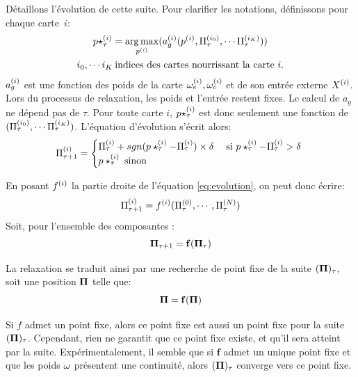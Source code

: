 Détaillons l'évolution de cette suite. Pour clarifier les notations, définissons pour chaque carte~$i$:
\begin{equation}
\begin{gathered}
p\star^{({i})}_{\tau} = \operatorname*{arg\,max}_{p^{({i})}}(a_g^{({i})}(p^{({i})},\Pi^{({i_0})}_\tau, \cdots \Pi^{({i_K})}_\tau))\\
 i_0, \cdots i_K \: \text{indices des cartes nourrissant la carte $i$}.
\end{gathered}
\label{eq:pstar}
\end{equation}
$a_g^{({i})}$ est une fonction des poids de la carte $\omega_{e}^{({i})}, \omega_{c}^{({i})}$ et de son entrée externe $X^{({i})}$. Lors du processus de relaxation, les poids et l'entrée restent fixes. Le calcul de $a_g$ ne dépend pas de $\tau$.
Pour toute carte $i$, $p\star^{({i})}_{\tau}$ est donc seulement une fonction de $(\Pi^{({i_0})}_\tau, \cdots \Pi^{({i_K})}_\tau)$.
L'équation d'évolution s'écrit alors: 
\begin{equation}
\Pi^{({i})}_{\tau+1} = 
\begin{cases}
\Pi^{({i})}_{\tau} + sgn(p\star^{({i})}_{\tau} - \Pi^{({i})}_{\tau}) \times \delta \; & \text{si $p\star^{({i})}_{\tau} - \Pi^{({i})}_{\tau} > \delta$ } \\
p\star^{({i})}_{\tau} \; \text{sinon}	
\end{cases}
\label{eq:evolution}
\end{equation}

En posant $f^{({i})}$ la partie droite de l'équation \ref{eq:evolution}, on peut donc écrire: 
\begin{equation}
\Pi^{({i})}_{\tau +1} = f^{({i})}(\Pi^{({0})}_\tau,\cdots,\Pi^{({N})}_\tau)
\label{eq:fonction}
\end{equation}
Soit, pour l'ensemble des composantes : 
\begin{equation}
\mathbf{\Pi}_{\tau+1} = \mathbf{f}(\mathbf{\Pi}_\tau)
\end{equation}

La relaxation se traduit ainsi par une recherche de point fixe de la suite $(\mathbf{\Pi})_{\tau}$, soit une position $\mathbf{\Pi}$ telle que:
\begin{equation}
\mathbf{\Pi} = \mathbf{f}(\mathbf{\Pi})
\label{eq:suite}
\end{equation}

Si $f$ admet un point fixe, alors ce point fixe est aussi un point fixe pour la suite $(\mathbf{\Pi})_\tau$. Cependant, rien ne garantit que ce point fixe existe, et qu'il sera atteint par la suite. Expérimentalement, il semble que si $\mathbf{f}$ admet un unique point fixe et que les poids $\omega$ présentent une continuité, alors $(\mathbf{\Pi})_{\tau}$ converge vers ce point fixe. 

